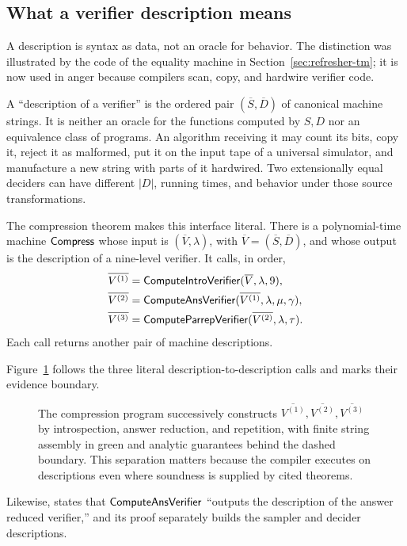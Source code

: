 \subsection{What a verifier description means}

\begin{reminder}
A description is syntax as data, not an oracle for behavior.  The distinction
was illustrated by the code of the equality machine in
Section~\ref{sec:refresher-tm}; it is now used in anger because compilers scan,
copy, and hardwire verifier code.
\end{reminder}

A ``description of a verifier'' is the ordered pair
\((\overline S,\overline D)\) of canonical machine strings.  It is neither an
oracle for the functions computed by \(S,D\) nor an equivalence class of
programs.  An algorithm receiving it may count its bits, copy it, reject it as
malformed, put it on the input tape of a universal simulator, and manufacture
a new string with parts of it hardwired.  Two extensionally equal deciders can
have different \(|D|\), running times, and behavior under those source
transformations.

The compression theorem makes this interface literal.  There is a
polynomial-time machine \(\mathsf{Compress}\) whose input is
\((\overline V,\lambda)\), with \(\overline V=(\overline S,\overline D)\), and
whose output is the description of a nine-level verifier.  It calls, in order,
\begin{align*}
 \overline{V^{(1)}}&=\mathsf{ComputeIntroVerifier}(\overline V,\lambda,9),\\
 \overline{V^{(2)}}&=\mathsf{ComputeAnsVerifier}
      (\overline{V^{(1)}},\lambda,\mu,\gamma),\\
 \overline{V^{(3)}}&=\mathsf{ComputeParrepVerifier}
      (\overline{V^{(2)}},\lambda,\tau).
\end{align*}
Each call returns another pair of machine descriptions.

Figure~\ref{fig:C-description-compiler} follows the three literal
description-to-description calls and marks their evidence boundary.
\begin{figure}[t]
\centering

\caption{The compression program successively constructs \(\overline{V^{(1)}},\overline{V^{(2)}},\overline{V^{(3)}}\) by introspection, answer reduction, and repetition, with finite string assembly in green and analytic guarantees behind the dashed boundary.  This separation matters because the compiler executes on descriptions even where soundness is supplied by cited theorems.}
\label{fig:C-description-compiler}
\end{figure}
Likewise,  states that \(\mathsf{ComputeAnsVerifier}\) ``outputs the
description of the answer reduced verifier,'' and its proof separately builds
the sampler and decider descriptions.

